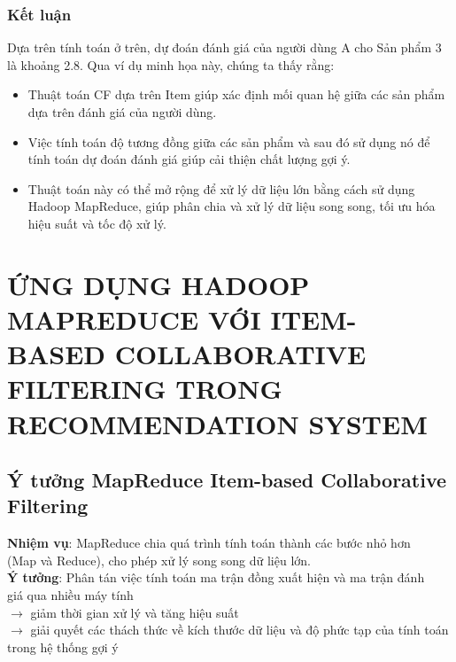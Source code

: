 \documentclass{report}
\begin{document}
\subsection*{Kết luận}
Dựa trên tính toán ở trên, dự đoán đánh giá của người dùng A cho Sản phẩm 3 là khoảng 2.8.
Qua ví dụ minh họa này, chúng ta thấy rằng:
\begin{itemize}
    \item Thuật toán CF dựa trên Item giúp xác định mối quan hệ
          giữa các sản phẩm dựa trên đánh giá của người dùng.
    \item Việc tính toán độ tương đồng giữa các sản phẩm và sau đó
          sử dụng nó để tính toán dự đoán đánh giá giúp cải thiện chất lượng gợi ý.
    \item Thuật toán này có thể mở rộng để xử lý dữ liệu lớn bằng cách
          sử dụng Hadoop MapReduce, giúp phân chia và xử lý dữ liệu song song,
          tối ưu hóa hiệu suất và tốc độ xử lý.
\end{itemize}

\chapter[ỨNG DỤNG HADOOP MAPREDUCE VỚI ITEM-BASED COLLABORATIVE FILTERING TRONG RECOMMENDATION SYSTEM]
 {\LARGE ỨNG DỤNG HADOOP MAPREDUCE VỚI ITEM-BASED COLLABORATIVE FILTERING TRONG RECOMMENDATION SYSTEM}

\section{Ý tưởng MapReduce Item-based Collaborative Filtering}
\textbf{Nhiệm vụ}: MapReduce chia quá trình tính toán thành các bước nhỏ hơn \\
\hspace*{2cm}(Map và Reduce), cho phép xử lý song song dữ liệu lớn. \\
\vspace{0.5cm}
\textbf{Ý tưởng}: Phân tán việc tính toán ma trận đồng xuất hiện và ma trận đánh \\
\hspace*{1.7cm}giá qua nhiều máy tính \\
\hspace*{1.7cm}$\rightarrow$ giảm thời gian xử lý và tăng hiệu suất \\
\hspace*{1.7cm}$\rightarrow$ giải quyết các thách thức về kích thước dữ liệu và độ phức tạp của tính toán trong hệ thống gợi ý
\end{document}
